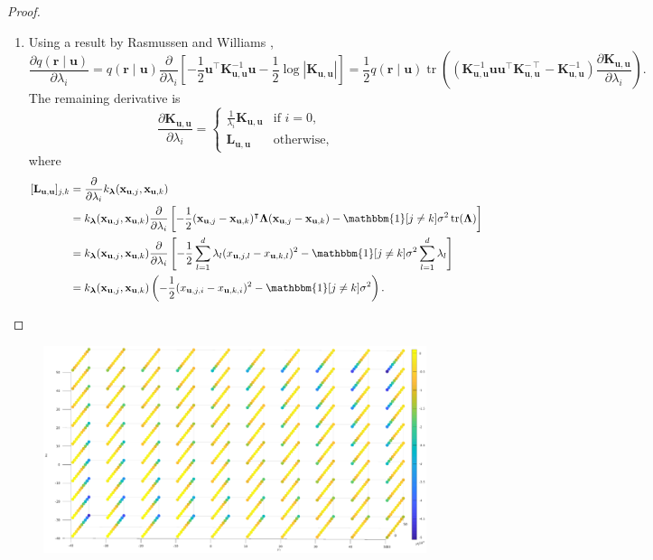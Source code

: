 \documentclass{article}
\theoremstyle{definition}
\theoremstyle{remark}
\DeclareMathOperator{\tr}{tr}
\newcommand{\Kuu}{\mathbf{K}_{\mathbf{u},\mathbf{u}}}
\newcommand{\Luu}{\mathbf{L}_{\mathbf{u},\mathbf{u}}}
\newcommand{\dl}{\frac{\partial}{\partial \lambda_i}}
\begin{document}
\begin{proof}
\begin{enumerate}
  \item Using a result by Rasmussen and Williams %
    \cite{DBLP:books/lib/RasmussenW06},
    \[
      \frac{\partial q(\mathbf{r} \mid \mathbf{u})}{\partial \lambda_i} =
      q(\mathbf{r} \mid \mathbf{u}) \dl
      \left[-\frac{1}{2}\mathbf{u}^\intercal\Kuu^{-1}\mathbf{u} -
        \frac{1}{2}\log|\Kuu| \right] = \frac{1}{2}q(\mathbf{r} \mid \mathbf{u})\tr
      \left((\Kuu^{-1}\mathbf{u}\mathbf{u}^\intercal\Kuu^{-\intercal} -
        \Kuu^{-1}) \frac{\partial \Kuu}{\partial \lambda_i} \right).
    \]
    The remaining derivative is
    \[
      \frac{\partial \Kuu}{\partial \lambda_i} =
      \begin{cases}
        \frac{1}{\lambda_i}\Kuu & \text{if } i = 0, \\
        \Luu & \text{otherwise,}
      \end{cases}
    \]
    where
    \[
      \begin{split}
        [\Luu]_{j,k} &= \dl k_{\bm\lambda}(\mathbf{x}_{\mathbf{u},j},
        \mathbf{x}_{\mathbf{u},k}) \\
        &= k_{\bm\lambda}(\mathbf{x}_{\mathbf{u},j}, \mathbf{x}_{\mathbf{u},k})
        \dl \left[-\frac{1}{2}(\mathbf{x}_{\mathbf{u},j} -
          \mathbf{x}_{\mathbf{u},k})^\intercal \bm\Lambda
          (\mathbf{x}_{\mathbf{u},j} - \mathbf{x}_{\mathbf{u},k}) -
          \mathbbm{1}[j \ne k]\sigma^2\tr(\bm\Lambda) \right] \\
        &= k_{\bm\lambda}(\mathbf{x}_{\mathbf{u},j}, \mathbf{x}_{\mathbf{u},k})
        \dl \left[-\frac{1}{2}\sum_{l=1}^d \lambda_l
          (x_{\mathbf{u},j,l} - x_{\mathbf{u},k,l})^2 -
          \mathbbm{1}[j \ne k]\sigma^2\sum_{l=1}^d \lambda_l \right] \\
        &= k_{\bm\lambda}(\mathbf{x}_{\mathbf{u},j}, \mathbf{x}_{\mathbf{u},k})
        \left( -\frac{1}{2}(x_{\mathbf{u},j,i} -
        x_{\mathbf{u},k,i})^2 - \mathbbm{1}[j \ne k]\sigma^2 \right).
      \end{split}
    \]
  \end{enumerate}
\end{proof}

\begin{figure}
  \centering
  \includegraphics[width=\textwidth]{elbo_over_mu}
\end{figure}



\end{document}
